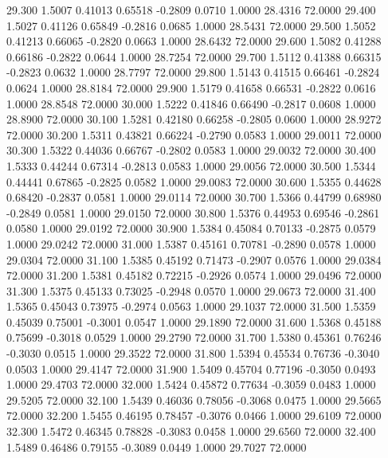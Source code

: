   29.300   1.5007   0.41013   0.65518  -0.2809   0.0710   1.0000  28.4316  72.0000
  29.400   1.5027   0.41126   0.65849  -0.2816   0.0685   1.0000  28.5431  72.0000
  29.500   1.5052   0.41213   0.66065  -0.2820   0.0663   1.0000  28.6432  72.0000
  29.600   1.5082   0.41288   0.66186  -0.2822   0.0644   1.0000  28.7254  72.0000
  29.700   1.5112   0.41388   0.66315  -0.2823   0.0632   1.0000  28.7797  72.0000
  29.800   1.5143   0.41515   0.66461  -0.2824   0.0624   1.0000  28.8184  72.0000
  29.900   1.5179   0.41658   0.66531  -0.2822   0.0616   1.0000  28.8548  72.0000
  30.000   1.5222   0.41846   0.66490  -0.2817   0.0608   1.0000  28.8900  72.0000
  30.100   1.5281   0.42180   0.66258  -0.2805   0.0600   1.0000  28.9272  72.0000
  30.200   1.5311   0.43821   0.66224  -0.2790   0.0583   1.0000  29.0011  72.0000
  30.300   1.5322   0.44036   0.66767  -0.2802   0.0583   1.0000  29.0032  72.0000
  30.400   1.5333   0.44244   0.67314  -0.2813   0.0583   1.0000  29.0056  72.0000
  30.500   1.5344   0.44441   0.67865  -0.2825   0.0582   1.0000  29.0083  72.0000
  30.600   1.5355   0.44628   0.68420  -0.2837   0.0581   1.0000  29.0114  72.0000
  30.700   1.5366   0.44799   0.68980  -0.2849   0.0581   1.0000  29.0150  72.0000
  30.800   1.5376   0.44953   0.69546  -0.2861   0.0580   1.0000  29.0192  72.0000
  30.900   1.5384   0.45084   0.70133  -0.2875   0.0579   1.0000  29.0242  72.0000
  31.000   1.5387   0.45161   0.70781  -0.2890   0.0578   1.0000  29.0304  72.0000
  31.100   1.5385   0.45192   0.71473  -0.2907   0.0576   1.0000  29.0384  72.0000
  31.200   1.5381   0.45182   0.72215  -0.2926   0.0574   1.0000  29.0496  72.0000
  31.300   1.5375   0.45133   0.73025  -0.2948   0.0570   1.0000  29.0673  72.0000
  31.400   1.5365   0.45043   0.73975  -0.2974   0.0563   1.0000  29.1037  72.0000
  31.500   1.5359   0.45039   0.75001  -0.3001   0.0547   1.0000  29.1890  72.0000
  31.600   1.5368   0.45188   0.75699  -0.3018   0.0529   1.0000  29.2790  72.0000
  31.700   1.5380   0.45361   0.76246  -0.3030   0.0515   1.0000  29.3522  72.0000
  31.800   1.5394   0.45534   0.76736  -0.3040   0.0503   1.0000  29.4147  72.0000
  31.900   1.5409   0.45704   0.77196  -0.3050   0.0493   1.0000  29.4703  72.0000
  32.000   1.5424   0.45872   0.77634  -0.3059   0.0483   1.0000  29.5205  72.0000
  32.100   1.5439   0.46036   0.78056  -0.3068   0.0475   1.0000  29.5665  72.0000
  32.200   1.5455   0.46195   0.78457  -0.3076   0.0466   1.0000  29.6109  72.0000
  32.300   1.5472   0.46345   0.78828  -0.3083   0.0458   1.0000  29.6560  72.0000
  32.400   1.5489   0.46486   0.79155  -0.3089   0.0449   1.0000  29.7027  72.0000
